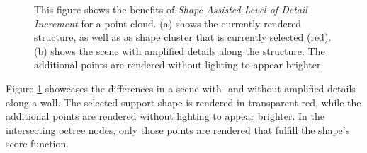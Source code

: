 \begin{figure}
\centering
{}\par\medskip
{}
\caption{This figure shows the benefits of \textit{Shape-Assisted Level-of-Detail Increment} for a point cloud. (a) shows the currently rendered structure, as well as as shape cluster that is currently selected (red). (b) shows the scene with amplified details along the structure. The additional points are rendered without lighting to appear brighter.}
\label{fig:lod_increment}
\end{figure}

Figure \ref{fig:lod_increment} showcases the differences in a scene with- and without amplified details along a wall. The selected support shape is rendered in transparent red, while the additional points are rendered without lighting to appear brighter. In the intersecting octree nodes, only those points are rendered that fulfill the shape's score function. 